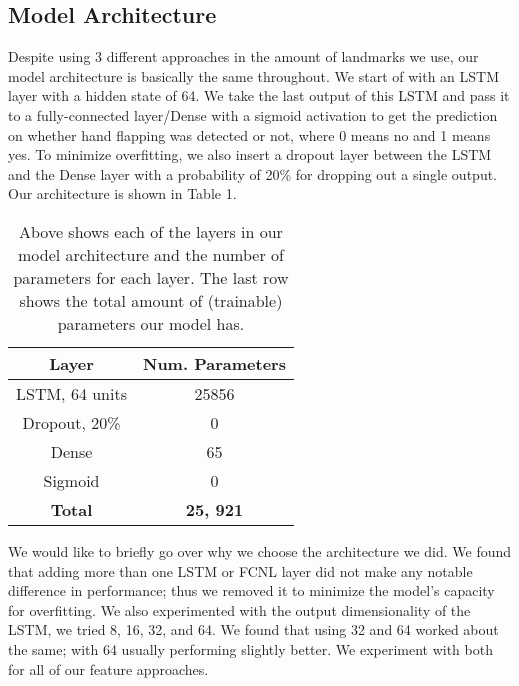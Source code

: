 \documentclass{article}
\begin{document}
\subsection{Model Architecture}

Despite using 3 different approaches in the amount of landmarks we use, our model architecture is basically the same throughout. We start of with an LSTM layer with a hidden state of 64. We take the last output of this LSTM and pass it to a fully-connected layer/Dense with a sigmoid activation to get the prediction on whether hand flapping was detected or not, where 0 means no and 1 means yes. To minimize overfitting, we also insert a dropout layer between the LSTM and the Dense layer with a probability of 20\% for dropping out a single output. Our architecture is shown in Table 1. 

\begin{table}[H]
    \centering
    \begin{tabular}{c|c}
    \hline 
    \textbf{Layer} & \textbf{Num. Parameters} \\ 
    \hline 
    LSTM, 64 units & 25856 \\
    \hline
    Dropout, 20\% & 0 \\ 
    \hline
    Dense & 65 \\ 
    \hline
    Sigmoid & 0 \\
    \hline
    \textbf{Total} & \textbf{25, 921} \\ 
    \hline
    \end{tabular}
    \caption{Above shows each of the layers in our model architecture and the number of parameters for each layer. The last row shows the total amount of (trainable) parameters our model has.}
\end{table}

We would like to briefly go over why we choose the architecture we did. We found that adding more than one LSTM or FCNL layer did not make any notable difference in performance; thus we removed it to minimize the model's capacity for overfitting. We also experimented with the output dimensionality of the LSTM, we tried 8, 16, 32, and 64. We found that using 32 and 64 worked about the same; with 64 usually performing slightly better. We experiment with both for all of our feature approaches. 
\end{document}

